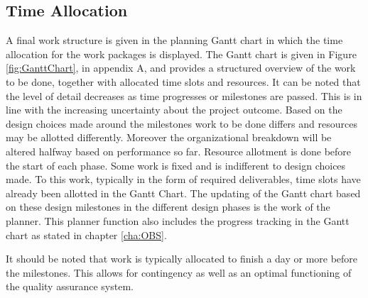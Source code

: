 \subsection{Time Allocation}\label{sec:timeallocation}

A final work structure is given in the planning Gantt chart in which the time allocation for the work packages is displayed. The Gantt chart is given in Figure \ref{fig:GanttChart}, in appendix A, and provides a structured overview of the work to be done, together with allocated time slots and resources. It can be noted that the level of detail decreases as time progresses or milestones are passed. This is in line with the increasing uncertainty about the project outcome. Based on the design choices made around the milestones work to be done differs and resources may be allotted differently. Moreover the organizational breakdown will be altered halfway based on performance so far. Resource allotment is done before the start of each phase. Some work is fixed and is indifferent to design choices made. To this work, typically in the form of required deliverables, time slots have already been allotted in the Gantt Chart. The updating of the Gantt chart based on these design milestones in the different design phases is the work of the planner. This planner function also includes the progress tracking in the Gantt chart as stated in chapter \ref{cha:OBS}.

It should be noted that work is typically allocated to finish a day or more before the milestones. This allows for contingency as well as an optimal functioning of the quality assurance system.



